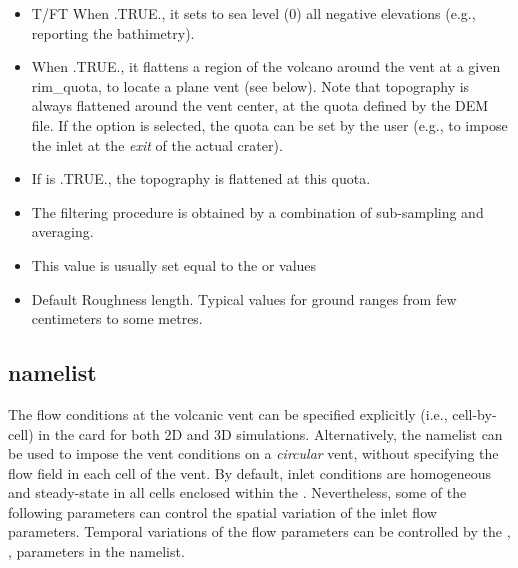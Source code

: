 \begin{itemize}
\item
{} {T/F}{T}
{When .TRUE., it sets to sea level (0) all negative elevations (e.g.,
reporting the bathimetry).}

\item
{}
{When .TRUE., it flattens a region of the volcano around the vent at a given 
rim\_quota, to locate a plane vent (see below). Note that topography is always
flattened around the vent center, at the quota defined by the DEM file. If
the  option is selected, the quota can be set by the user
(e.g., to impose the inlet at the {\em exit} of the actual crater).}

\item
{}
{If  is .TRUE., the topography is flattened at this quota.}

\item
{}
{The filtering procedure is obtained by a combination of sub-sampling and averaging.}

\item
{}
{This value is usually set equal to the  or  values}

\item
{}
{Default Roughness length. Typical values for ground
ranges from few centimeters to some metres.}
\end{itemize}

\subsection{ namelist}
The flow conditions at the volcanic vent can be specified
explicitly (i.e., cell-by-cell) in the  
card for both 2D and 3D simulations.
Alternatively, the  namelist can be used to impose the vent
conditions on a {\em circular} vent, without specifying the flow field in each 
cell of the vent. 
By default, inlet conditions are homogeneous and steady-state in all cells
enclosed within the . Nevertheless, some of the
following parameters can control the spatial variation of the inlet 
flow parameters. Temporal variations of the flow parameters can be
controlled by the , ,  parameters in the
 namelist. 

